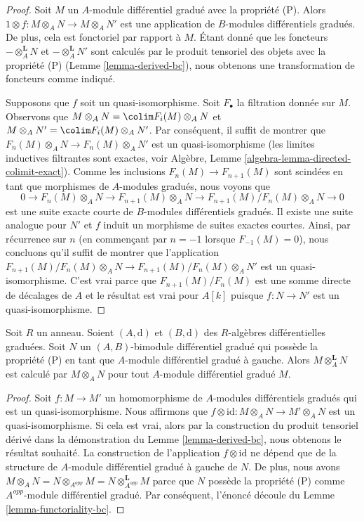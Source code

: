 \begin{proof}
Soit $M$ un $A$-module différentiel gradué avec la propriété (P). Alors $1 \otimes
f : M \otimes_A N \to M \otimes_A N'$ est une application de $B$-modules
différentiels gradués. De plus, cela est fonctoriel par rapport à $M$. Étant donné
que les foncteurs $- \otimes_A^\mathbf{L} N$ et $- \otimes_A^\mathbf{L} N'$ sont
calculés par le produit tensoriel des objets avec la propriété (P) (Lemme
\ref{lemma-derived-bc}), nous obtenons une transformation de foncteurs comme
indiqué.

\medskip\noindent
Supposons que $f$ soit un quasi-isomorphisme. Soit $F_\bullet$ la filtration
donnée sur $M$. Observons que $M \otimes_A N = \colim F_i(M) \otimes_A N$ et $M
\otimes_A N' = \colim F_i(M) \otimes_A N'$. Par conséquent, il suffit de montrer
que $F_n(M) \otimes_A N \to F_n(M) \otimes_A N'$ est un quasi-isomorphisme (les
limites inductives filtrantes sont exactes, voir Algèbre, Lemme
\ref{algebra-lemma-directed-colimit-exact}). Comme les inclusions $F_n(M) \to F_{n
+ 1}(M)$ sont scindées en tant que morphismes de $A$-modules gradués, nous voyons
que
$$
0 \to F_n(M) \otimes_A N \to F_{n + 1}(M) \otimes_A N \to
F_{n + 1}(M)/F_n(M) \otimes_A N \to 0
$$
est une suite exacte courte de $B$-modules différentiels gradués. Il existe une
suite analogue pour $N'$ et $f$ induit un morphisme de suites exactes
courtes. Ainsi, par récurrence sur $n$ (en commençant par $n = -1$ lorsque
$F_{-1}(M) = 0$), nous concluons qu'il suffit de montrer que l'application $F_{n +
1}(M)/F_n(M) \otimes_A N \to F_{n + 1}(M)/F_n(M) \otimes_A N'$ est un
quasi-isomorphisme. C'est vrai parce que $F_{n + 1}(M)/F_n(M)$ est une somme
directe de décalages de $A$ et le résultat est vrai pour $A[k]$ puisque $f : N \to
N'$ est un quasi-isomorphisme.
\end{proof}

\begin{lemma}
\label{lemma-compute-bc}
Soit $R$ un anneau. Soient $(A, \text{d})$ et $(B, \text{d})$ des $R$-algèbres
différentielles graduées. Soit $N$ un $(A, B)$-bimodule différentiel gradué qui
possède la propriété (P) en tant que $A$-module différentiel gradué à gauche.
Alors $M \otimes_A^\mathbf{L} N$ est calculé par $M \otimes_A N$ pour tout
$A$-module différentiel gradué $M$.
\end{lemma}

\begin{proof}
Soit $f : M \to M'$ un homomorphisme de $A$-modules différentiels gradués qui est
un quasi-isomorphisme. Nous affirmons que $f \otimes \text{id} : M \otimes_A N \to
M' \otimes_A N$ est un quasi-isomorphisme. Si cela est vrai, alors par la
construction du produit tensoriel dérivé dans la démonstration du Lemme
\ref{lemma-derived-bc}, nous obtenons le résultat souhaité. La construction de
l'application $f \otimes \text{id}$ ne dépend que de la structure de $A$-module
différentiel gradué à gauche de $N$. De plus, nous avons $M \otimes_A N = N
\otimes_{A^{opp}} M = N \otimes_{A^{opp}}^\mathbf{L} M$ parce que $N$ possède la
propriété (P) comme $A^{opp}$-module différentiel gradué. Par conséquent,
l'énoncé découle du Lemme \ref{lemma-functoriality-bc}.
\end{proof}

